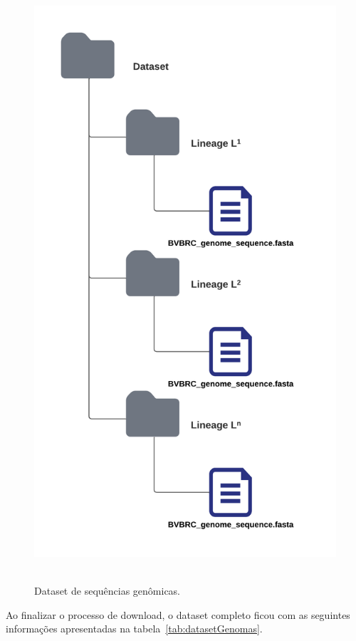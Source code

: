 \begin{figure}[htb]
  \centering
  \caption{Dataset de sequências genômicas.}
  \includegraphics[scale=0.5]{figuras/dataset_principal.png}
  ~\label{fig:datasetGenomas}
\end{figure}

Ao finalizar o processo de download, o dataset completo ficou com as seguintes informações apresentadas na tabela~\ref{tab:datasetGenomas}.

